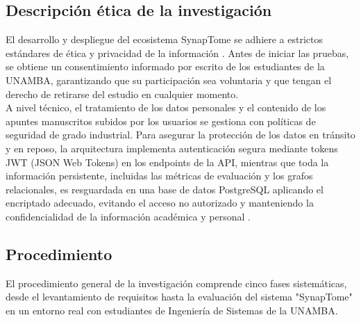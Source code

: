 \subsection{Descripción ética de la investigación}

El desarrollo y despliegue del ecosistema SynapTome se adhiere a estrictos estándares de ética y privacidad de la información \parencite{Kreijkes2026, Dano2026}. Antes de iniciar las pruebas, se obtiene un consentimiento informado por escrito de los estudiantes de la UNAMBA, garantizando que su participación sea voluntaria y que tengan el derecho de retirarse del estudio en cualquier momento.\\
A nivel técnico, el tratamiento de los datos personales y el contenido de los apuntes manuscritos subidos por los usuarios se gestiona con políticas de seguridad de grado industrial. Para asegurar la protección de los datos en tránsito y en reposo, la arquitectura implementa autenticación segura mediante tokens JWT (JSON Web Tokens) en los endpoints de la API, mientras que toda la información persistente, incluidas las métricas de evaluación y los grafos relacionales, es resguardada en una base de datos PostgreSQL aplicando el encriptado adecuado, evitando el acceso no autorizado y manteniendo la confidencialidad de la información académica y personal \parencite{Upadhyay2026}.

\subsection{Procedimiento}

El procedimiento general de la investigación comprende cinco fases sistemáticas, desde el levantamiento de requisitos hasta la evaluación del sistema "SynapTome" en un entorno real con estudiantes de Ingeniería de Sistemas de la UNAMBA. 

